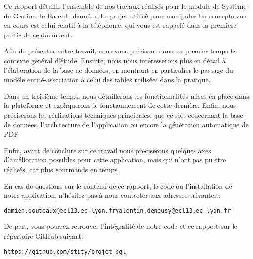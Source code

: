 \label{sec:introduction}
Ce rapport détaille l'ensemble de nos travaux réalisés pour le module de Système de Gestion de Base de données. Le projet utilisé pour manipuler les concepts vus en cours est celui relatif à la téléphonie, qui vous est rappelé dans la première partie de ce document.

Afin de présenter notre travail, nous vous précisons dans un premier temps le contexte général d'étude. Ensuite, nous nous intéresserons plus en détail à l'élaboration de la base de données, en montrant en particulier le passage du modèle entité-association à celui des tables utilisées dans la pratique.

Dans un troisième temps, nous détaillerons les fonctionnalités mises en place dans la plateforme et expliquerons le fonctionnement de cette dernière. Enfin, nous préciserons les réalisations techniques principales, que ce soit concernant la base de données, l'architecture de l'application ou encore la génération automatique de PDF.

Enfin, avant de conclure sur ce travail nous préciserons quelques axes d'amélioration possibles pour cette application, mais qui n'ont pas pu être réalisés, car plus gourmands en temps.
\vspace*{.5cm}

En cas de questions sur le contenu de ce rapport, le code ou l'installation de notre application, n'hésitez pas à nous contecter aux adresses suivantes :
\begin{center}
\texttt{damien.douteaux@ecl13.ec-lyon.fr}\hspace{2cm}\texttt{valentin.demeusy@ecl13.ec-lyon.fr}
\end{center}
De plus, vous pourrez retrouver l'intégralité de notre code et ce rapport sur le répertoire GitHub suivant:
\begin{center}
  \texttt{https://github.com/stity/projet\_sql}
\end{center}

\vspace*{2cm}
\noindent{}


